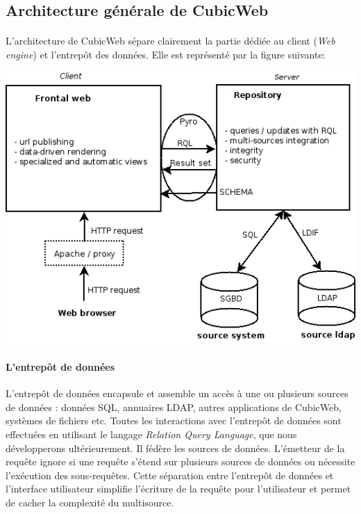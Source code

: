\documentclass {report}
\begin{document}




\subsection{Architecture générale de CubicWeb}

\paragraph{}
L'architecture de CubicWeb sépare clairement la partie dédiée au client (\textit{Web engine}) et l'entrepôt des données.  Elle est représenté par la figure suivante:

\begin{center}
\includegraphics[scale=0.7]{archi_globale.png}
\end{center}

\paragraph{L'entrepôt de données}
L'entrepôt de données encapsule et assemble un accès à une ou plusieurs sources de données : données SQL, annuaires LDAP, autres applications de CubicWeb, systèmes de fichiers etc. Toutes les interactions avec l'entrepôt de données sont effectuées en utilisant le langage \textit{Relation Query Language}, que nous développerons ultérieurement. Il fédère les sources de données. L'émetteur de la requête ignore si une requête s'étend sur plusieurs sources de données ou nécessite l'exécution des sous-requêtes. Cette séparation entre l'entrepôt de données et l'interface utilisateur simplifie l'écriture de la requête pour l'utilisateur et permet de cacher la complexité du multisource.
\end{document}
